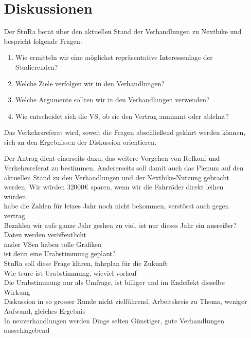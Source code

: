 \section{Diskussionen}

    {
    Der StuRa berät über den aktuellen Stand der Verhandlungen zu Nextbike und bespricht folgende Fragen:\\
    \begin{enumerate}
    \item Wie ermitteln wir eine möglichst repräsentative Interessenlage der Studierenden?
    \item Welche Ziele verfolgen wir in den Verhandlungen?
    \item Welche Argumente sollten wir in den Verhandlungen verwenden?
    \item Wie entscheidet sich die VS, ob sie den Vertrag annimmt oder ablehnt?
    \end{enumerate}
    Das Verkehrsreferat wird, soweit die Fragen abschließend geklärt werden können, sich an den Ergebnissen der Diskussion orientieren.
    }{
        Der Antrag dient einerseits dazu, das weitere Vorgehen von Refkonf und Verkehrsreferat zu bestimmen. Andererseits soll damit auch das Plenum auf den aktuellen Stand zu den Verhandlungen und der Nextbike-Nutzung gebracht werden.
    }{
        Wir würden 32000€ sparen, wenn wir die Fahrräder direkt leihen würden.\\
        habe die Zahlen für letzes Jahr noch nicht bekommen, verstösst auch gegen vertrag\\
        Bezahlen wir aufs ganze Jahr geshen zu viel, ist nur dieses Jahr ein ausreißer?\\
            Daten werden veröffentlicht\\
        ander VSen haben tolle Grafiken\\
        ist denn eine Urabstimmung geplant?\\
            StuRa soll diese Frage klären, fahrplan für die Zukunft\\
        Wie teure ist Urabstimmung, wieviel vorlauf\\
            Die Urabstimmung nur als Umfrage, ist billiger und im Endeffekt dieselbe Wirkung\\
        Diskussion in so grosser Runde nicht zielführend, Arbeitskreis zu Thema, weniger Aufwand, gleiches Ergebnis\\
        In neuverhandlungen werden Dinge selten Günstiger, gute Verhandlungen ausschlagebend\\
    }
